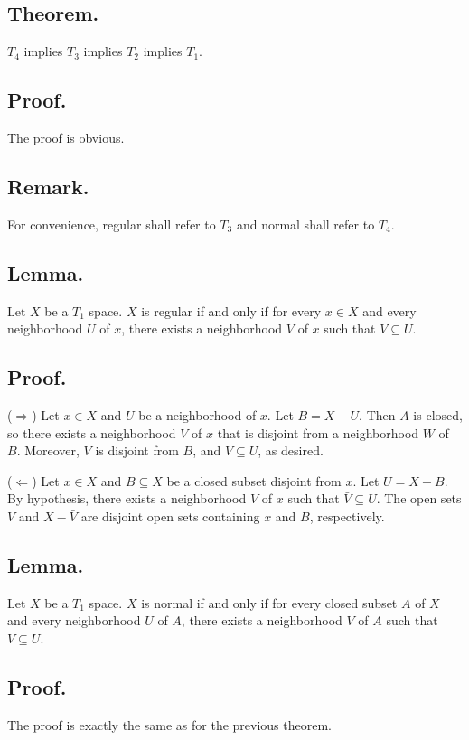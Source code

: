 \documentclass[titlepage]{article}
\begin{document}
\subsection{Theorem.} $T_{4}$ implies $T_{3}$ implies $T_{2}$ implies $T_{1}$.

\subsection{Proof.} The proof is obvious.

\subsection{Remark.} For convenience, regular shall refer to $T_{3}$ and normal shall refer to $T_{4}$.

\subsection{Lemma.} Let $X$ be a $T_{1}$ space. $X$ is regular if and only if for every $x \in X$ and every neighborhood $U$ of $x$, there exists a neighborhood $V$ of $x$ such that $\overline{V} \subseteq U$.

\subsection{Proof.}

($\Rightarrow$) Let $x \in X$ and $U$ be a neighborhood of $x$. Let $B = X - U$. Then $A$ is closed, so there exists a neighborhood $V$ of $x$ that is disjoint from a neighborhood $W$ of $B$. Moreover, $\bar{V}$ is disjoint from $B$, and $\bar{V} \subseteq U$, as desired.

($\Leftarrow$) Let $x \in X$ and $B \subseteq X$ be a closed subset disjoint from $x$. Let $U = X - B$. By hypothesis, there exists a neighborhood $V$ of $x$ such that $\bar{V} \subseteq U$. The open sets $V$ and $X - \bar{V}$ are disjoint open sets containing $x$ and $B$, respectively.

\subsection{Lemma.} Let $X$ be a $T_{1}$ space. $X$ is normal if and only if for every closed subset $A$ of $X$ and every neighborhood $U$ of $A$, there exists a neighborhood $V$ of $A$ such that $\overline{V} \subseteq U$.

\subsection{Proof.} The proof is exactly the same as for the previous theorem.
\end{document}
